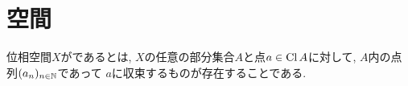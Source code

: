 \documentclass[uplatex, dvipdfmx, a4paper, 12pt, class=jsbook, crop=false]{standalone}
\begin{document}
\section{\Frechet 空間}
\label{sec:Frechet-spaces}

\begin{definition}
	位相空間$ X $が\indexe{\Frechet}であるとは,
	$ X $の任意の部分集合$ A $と点$ a \in \mathop{\mathrm{Cl}}\nolimits A $に対して,
	$ A $内の点列$ (a_n)_{n \in \mathbb{N}} $であって
	$ a $に収束するものが存在することである.
\end{definition}
\end{document}
